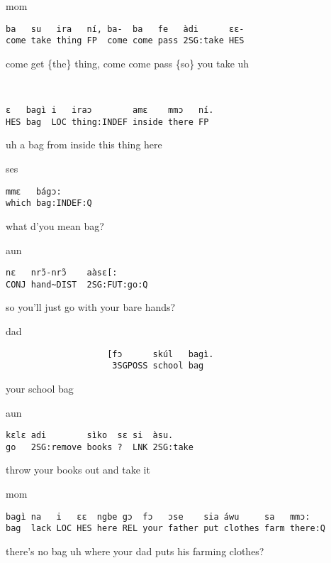 \documentclass[output=paper]{langsci/langscibook}
\begin{document}
\newpage
{}\vspace{-1mm}
%
\begin{mdframednoverticalspace}[style=firstfoc]
%
\begin{transbox}{1}{mom}
\begin{verbatim}
ba   su   ira   ní, ba-  ba   fe   àdi      ɛɛ-
come take thing FP  come come pass 2SG:take HES
\end{verbatim}
come get \{the\} thing, come come pass \{so\} you take uh
\end{transbox}
\end{mdframednoverticalspace}
%
\begin{transbox}{2}{~}
\begin{verbatim}
ɛ   bagì i   iraɔ        amɛ    mmɔ   ní.
HES bag  LOC thing:INDEF inside there FP
\end{verbatim}
uh a bag from inside this thing here
\end{transbox}
%
\begin{mdframednoverticalspace}[style=secondfoc]
\begin{transbox}{3}{ses}
\begin{verbatim}
mmɛ   bágɔ:
which bag:INDEF:Q
\end{verbatim}
what d’you mean bag?
\end{transbox}
\end{mdframednoverticalspace}
%
%
\begin{transbox}{5}{aun}
\begin{verbatim}
nɛ   nrɔ̃-nrɔ̃ 	  aàsɛ[:
CONJ hand~DIST  2SG:FUT:go:Q
\end{verbatim}
so you’ll just go with your bare hands?
\end{transbox}
%
\begin{transbox}{6}{dad}
\begin{verbatim}
                    [fɔ      skúl   bagì.
                     3SGPOSS school bag
\end{verbatim}
\hspace{3.1cm} your school bag
\end{transbox}
%
%
\begin{transbox}{8}{aun}
\begin{verbatim}
kɛlɛ adi        sìko  sɛ si  àsu.
go   2SG:remove books ?  LNK 2SG:take
\end{verbatim}
throw your books out and take it
\end{transbox}
%
\begin{transbox}{9}{mom}
\begin{verbatim}
bagì na   i   ɛɛ  ngbe gɔ  fɔ   ɔse    sia áwu     sa   mmɔ:
bag  lack LOC HES here REL your father put clothes farm there:Q
\end{verbatim}
there’s no bag uh where your dad puts his farming clothes?
\end{transbox}
\end{document}
